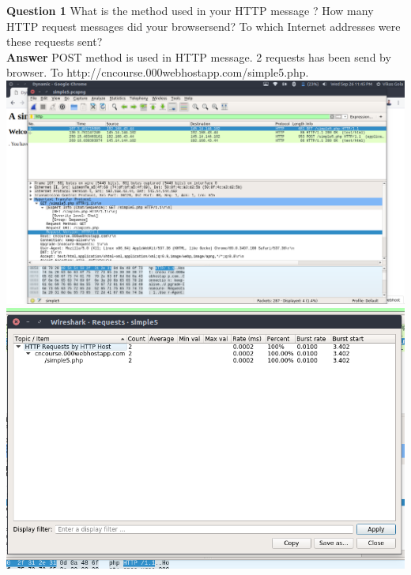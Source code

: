 \documentclass[14pt]{extarticle}
\begin{document}
    \noindent
    \textbf{\large Question 1}
    What is the method used in your HTTP message ?  How many HTTP request messages did your browsersend?  To which Internet addresses were these requests sent?\\
    \textbf{\large Answer}
    POST method is used in HTTP message. 2 requests has been send by browser. To http://cncourse.000webhostapp.com/simple5.php.\\[10pt]
    \includegraphics[scale=0.40]{s4}\\[10pt]    
    \includegraphics[scale=0.40]{s4_1}\\[10pt]    
    \vspace{1cm}
\end{document}
